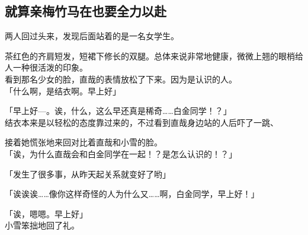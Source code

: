\subsection{就算亲梅竹马在也要全力以赴}

两人回过头来，发现后面站着的是一名女学生。

茶红色的齐肩短发，短裙下修长的双腿。总体来说非常地健康，微微上翘的眼梢给人一种很活泼的印象。\\

看到那名少女的脸，直哉的表情放松了下来。因为是认识的人。\\

「什么啊，是结衣啊。早上好」

「早上好—。诶，什么，这么早还真是稀奇……白金同学！？」\\

结衣本来是以轻松的态度靠过来的，不过看到直哉身边站的人后吓了一跳、

接着她慌张地来回对比着直哉和小雪的脸。\\

「诶，为什么直哉会和白金同学在一起！？是怎么认识的！？」

「发生了很多事，从昨天起关系就变好了哟」

「诶诶诶……像你这样奇怪的人为什么又……啊，白金同学，早上好！」

「诶，嗯嗯。早上好」\\

小雪笨拙地回了礼。

